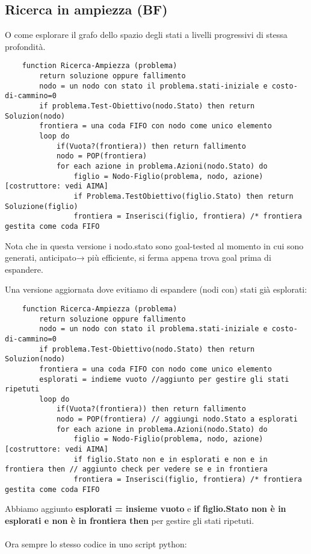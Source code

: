 \subsection{Ricerca in ampiezza (BF)}
O come esplorare il grafo dello spazio degli stati a livelli progressivi di stessa profondità.
\begin{lstlisting}
	function Ricerca-Ampiezza (problema)
		return soluzione oppure fallimento
		nodo = un nodo con stato il problema.stati-iniziale e costo-di-cammino=0
		if problema.Test-Obiettivo(nodo.Stato) then return Soluzion(nodo)
		frontiera = una coda FIFO con nodo come unico elemento
		loop do
			if(Vuota?(frontiera)) then return fallimento
			nodo = POP(frontiera)
			for each azione in problema.Azioni(nodo.Stato) do
				figlio = Nodo-Figlio(problema, nodo, azione) [costruttore: vedi AIMA]
				if Problema.TestObiettivo(figlio.Stato) then return Soluzione(figlio)
				frontiera = Inserisci(figlio, frontiera) /* frontiera gestita come coda FIFO
\end{lstlisting}
\begin{note}
	Nota che in questa versione i nodo.stato sono goal-tested al momento in cui sono generati, anticipato→ più efficiente, si ferma appena trova goal prima di espandere.
\end{note}
Una versione aggiornata dove evitiamo di espandere (nodi con) stati già esplorati:
\begin{lstlisting}
	function Ricerca-Ampiezza (problema)
		return soluzione oppure fallimento
		nodo = un nodo con stato il problema.stati-iniziale e costo-di-cammino=0
		if problema.Test-Obiettivo(nodo.Stato) then return Soluzion(nodo)
		frontiera = una coda FIFO con nodo come unico elemento
		esplorati = indieme vuoto //aggiunto per gestire gli stati ripetuti
		loop do
			if(Vuota?(frontiera)) then return fallimento
			nodo = POP(frontiera) // aggiungi nodo.Stato a esplorati
			for each azione in problema.Azioni(nodo.Stato) do
				figlio = Nodo-Figlio(problema, nodo, azione) [costruttore: vedi AIMA]
				if figlio.Stato non e in esplorati e non e in frontiera then // aggiunto check per vedere se e in frontiera
				frontiera = Inserisci(figlio, frontiera) /* frontiera gestita come coda FIFO
\end{lstlisting}
Abbiamo aggiunto \textbf{esplorati = insieme vuoto} e \textbf{if figlio.Stato non è in esplorati e non è in frontiera then} 
per gestire gli stati ripetuti.\\\\
Ora sempre lo stesso codice in uno script python:
